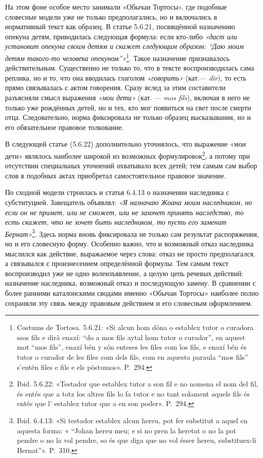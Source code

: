 На этом фоне особое место занимали «Обычаи Тортосы», где подобные словесные модели уже не только предполагались, но и включались в нормативный текст как образец. В статье 5.6.21, посвящённой назначению опекуна детям, приводилась следующая формула: если кто-либо \emph{«даст или установит опекуна своим детям и скажет следующим образом: “Даю моим детям такого-то человека опекуном”»}\footnote{Costums de Tortosa. 5.6.21: «Si alcun hom dóna o establex tutor o curadora ssos fils e dirà enaxí: “do a mos fils aytal hom tutor o curador”, en aquest mot “mos fils”, enaxí bén y són enteses les files com los fils, e enaxí bén és tutor o curador de les files com dels fils, com en aquesta paraula “mos fils” s'entén files e fils e els pòstumos». P.~294.}. Такое назначение признавалось действительным. Существенно не только то, что в тексте воспроизводилась сама реплика, но и то, что она вводилась глаголом \emph{«говорить»} (кат.--- \emph{dir}), то есть прямо связывалась с актом говорения. Сразу вслед за этим составители разъясняли смысл выражения \emph{«мои дети»}\emph{ }(кат. --- \emph{mos fils}), включая в него не только уже рождённых детей, но и тех, кто мог появиться на свет после смерти отца. Следовательно, норма фиксировала не только образец высказывания, но и его обязательное правовое толкование.

В следующей статье (5.6.22) дополнительно уточнялось, что выражение «мои дети» являлось наиболее широкой из возможных формулировок\footnote{Ibid. 5.6.22: «Testador que establex tutor a son fil e no nomena el nom del fil, és entés que a totz los altres fils lo fa tutor e no tant solament aquels fils és entés que l' establex tutor que a en son poder». P.~294.}, а потому при отсутствии специальных уточнений охватывало всех детей; тем самым сам выбор слов в подобных актах приобретал самостоятельное правовое значение.

По сходной модели строилась и статья 6.4.13 о назначении наследника с субституцией. Завещатель объявлял: \emph{«Я назначаю Жоана моим наследником, но если он не примет, или не сможет, или не захочет принять наследство, то есть скажет, что не хочет быть наследником, то пусть его заменит Бернат»}\footnote{Ibid. 6.4.13: «Si testador establex alcun hereu, pot fer substitut a aquel en aquesta forma: « “Johan hereu meu; e si no pren la heretat o no la pot pendre o no la vol pendre, so és que diga que no vol ésser hereu, substituex-li Bernat”». P.~310.}. Здесь норма вновь фиксировала не только сам результат распоряжения, но и его словесную форму. Особенно важно, что и возможный отказ наследника мыслился как действие, выражаемое через слова: отказ не просто предполагался, а связывался с произнесением определённой формулы. Тем самым текст воспроизводил уже не одно волеизъявление, а целую цепь речевых действий: назначение наследника, возможный отказ и последующую замену. В сравнении с более ранними каталонскими сводами именно «Обычаи Тортосы» наиболее полно сохраняли эту связь между правовым действием и его словесным оформлением.

